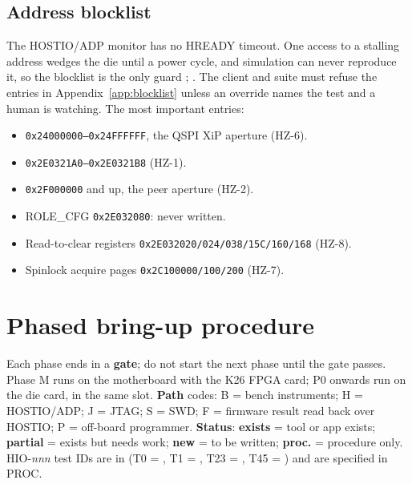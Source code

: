 \documentclass[10pt,a4paper]{article}
\newcommand\src{\leavevmode\begingroup\color{srcgray}\srcaux}
\newcommand\srcaux[1]{\srcraw{#1}\endgroup}
\newcommand\EX{\textcolor{ok}{\textbf{exists}}}
\newcommand\PA{\textcolor{amber}{\textbf{partial}}}
\newcommand\NW{\textcolor{warn}{\textbf{new}}}
\newcommand\PR{\textcolor{srcgray}{\textbf{proc.}}}
\begin{document}
\subsection{Address blocklist}
The HOSTIO/ADP monitor has no HREADY timeout. One access to a stalling address wedges the die until a power cycle, and simulation can never reproduce it, so the blocklist is the only guard \src{REG:198-208}; \src{PROC:1136-1147}. The client and suite must refuse the entries in Appendix~\ref{app:blocklist} unless an override names the test and a human is watching. The most important entries:
\begin{itemize}
\item \texttt{0x24000000--0x24FFFFFF}, the QSPI XiP aperture (HZ-6).
\item \texttt{0x2E0321A0--0x2E0321B8} (HZ-1).
\item \texttt{0x2F000000} and up, the peer aperture (HZ-2).
\item ROLE\_CFG \texttt{0x2E032080}: never written.
\item Read-to-clear registers \texttt{0x2E032020/024/038/15C/160/168} (HZ-8).
\item Spinlock acquire pages \texttt{0x2C100000/100/200} (HZ-7).
\end{itemize}

\section{Phased bring-up procedure}\label{sec:phases}
Each phase ends in a \textbf{gate}; do not start the next phase until the gate passes. Phase M runs on the motherboard with the K26 FPGA card; P0 onwards run on the die card, in the same slot. \textbf{Path} codes: B = bench instruments; H = HOSTIO/ADP; J = JTAG; S = SWD; F = firmware result read back over HOSTIO; P = off-board programmer. \textbf{Status}: \EX{} = tool or app exists; \PA{} = exists but needs work; \NW{} = to be written; \PR{} = procedure only. HIO-\textit{nnn} test IDs are in  (T0 = , T1 = , T23 = , T45 = ) and are specified in PROC.
\end{document}
